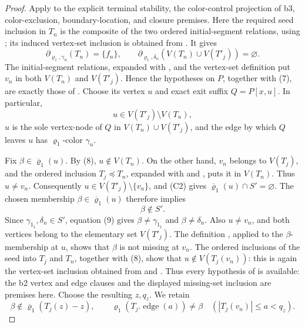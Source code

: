 \begin{proof}
Apply  to the explicit
terminal stability, the color-control projection of b3, color-exclusion,
boundary-location, and closure premises.  Here the required seed inclusion
in \(T_n\) is the composite of the two ordered initial-segment relations,
using ; its induced vertex-set
inclusion is obtained from .  It gives
\[
 \partial_{\varrho_1,\gamma_n}(T_n)=\{f_n\},\qquad
 \partial_{\varrho_1,\delta_n}(V(T_n)\cup V(T'_j))=\varnothing. \tag{7}
\]
The initial-segment relations, expanded with
, and the vertex-set definition
 put \(v_n\) in both \(V(T_n)\) and
\(V(T'_j)\).  Hence the hypotheses on \(P\), together with (7), are exactly
those of .  Choose its vertex
\(u\) and exact exit suffix \(Q=P[x,u]\).  In particular,
\[
 u\in V(T'_j)\setminus V(T_n),                                \tag{8}
\]
\(u\) is the sole vertex-node of \(Q\) in
\(V(T_n)\cup V(T'_j)\), and the edge by which \(Q\) leaves \(u\) has
\(\varrho_1\)-color \(\gamma_n\).

Fix \(\beta\in\overline{\varrho}_1(u)\).
By (8), \(u\notin V(T_n)\).  On the other hand,
\(v_n\) belongs to \(V(T_j)\), and the ordered inclusion
\(T_j\preccurlyeq T_n\), expanded with
 and
, puts it in \(V(T_n)\).  Thus \(u\ne v_n\).
Consequently
\(u\in V(T'_j)\setminus\{v_n\}\), and (C2) gives
\(\overline{\varrho}_1(u)\cap S'=\varnothing\).  The chosen membership
\(\beta\in\overline{\varrho}_1(u)\) therefore implies
\[
                              \beta\notin S'.                  \tag{9}
\]
Since \(\gamma_{1_1},\delta_n\in S'\), equation (9) gives
\(\beta\ne\gamma_{1_1}\) and \(\beta\ne\delta_n\).  Also \(u\ne v_n\),
and both vertices belong to the elementary set \(V(T'_j)\).  The
definition , applied to the
\(\beta\)-membership at \(u\), shows that \(\beta\) is not missing at
\(v_n\).  The ordered inclusions of the seed into \(T_j\) and \(T_n\),
together with (8), show that \(u\notin V(T_j(v_n))\): this is again the
vertex-set inclusion obtained from 
and .  Thus every
hypothesis of  is available:
the b2 vertex and edge clauses and the displayed missing-set inclusion
are premises here.  Choose the resulting \(z,q_z\).  We retain
\[
 \beta\notin\overline{\varrho}_1(T_j(z)-z),\qquad
 \varrho_1(T_j.\operatorname{edge}(a))\ne\beta
 \quad(|T_j(v_n)|\le a<q_z).                                 \tag{10}
\]


\end{proof}
